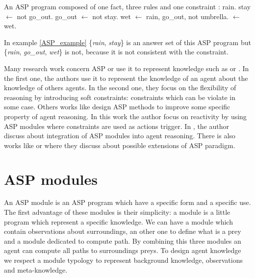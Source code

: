 \documentclass{aamas2012}
\begin{document}
	\begin{example}
		\label{ASP_example}
		An ASP program composed of one fact, three rules and one constraint :\newline
		\newline
		rain.\newline
		stay $\leftarrow$ not go\_out.\newline
		go\_out $\leftarrow$ not stay.\newline
		wet $\leftarrow$ rain, go\_out, not umbrella.\newline
		$\leftarrow$ wet.
	\end{example}
	
	In example \ref{ASP_example} \{\emph{rain}, \emph{stay}\} is an answer set of this ASP program but \{\emph{rain}, \emph{go\_out}, \emph{wet}\} is not, 
	because it is not consistent with the constraint.
	
	Many research work concern ASP or use it to represent knowledge such as \cite{DBLP:conf/atal/BaralGSP10} or \cite{DBLP:conf/clima/NieuwenborghVHV06}.
	In the first one, the authors use it to represent the knowledge of an agent about the knowledge of others agents.
	In the second one, they focus on the flexibility of reasoning by introducing soft constraints: constraints which can be violate in some case.
	Others works like \cite{DBLP:conf/datalog/Costantini10} design ASP methods to improve some specific property of agent reasoning.
	In this work the author focus on reactivity by using ASP modules where constraints are used as actions trigger.
	In \cite{DBLP:conf/lpnmr/Costantini09}, the author discuss about integration of ASP modules into agent reasoning.
	There is also works like \cite{DBLP:conf/aaaiss/BaralAD06} or \cite{DBLP:conf/birthday/FaberW11} where they discuss about possible extensions of ASP paradigm.

\section{ASP modules}

	An ASP module is an ASP program which have a specific form and a specific use.
	The first advantage of these modules is their simplicity: a module is a little program which represent a specific knowledge.
	We can have a module which contain observations about surroundings,
	an other one to define what is a prey and a module dedicated to compute path.
	By combining this three modules an agent can compute all paths to surroundings preys.
	To design agent knowledge we respect a module typology to represent background knowledge, observations and meta-knowledge.
\end{document}
